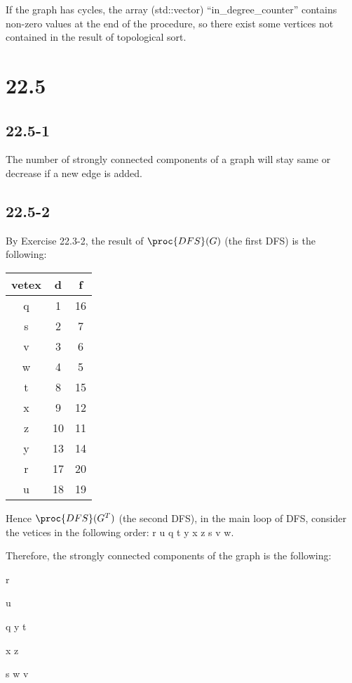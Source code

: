 If the graph has cycles, the array (std::vector) ``in\_degree\_counter'' 
contains non-zero values at the end of the procedure,
so there exist some vertices not contained in
the result of topological sort.

\section*{22.5}

\subsection*{22.5-1}

The number of strongly connected components of a graph will 
stay same or decrease if a new edge is added.

\subsection*{22.5-2}

By Exercise 22.3-2, the result of $\proc{DFS}(G)$ (the first DFS) is the following:

\begin{tabular}{c|c|c}
    vetex & d & f \\
    \hline
    q & 1 & 16 \\
    s & 2 & 7 \\
    v & 3 & 6 \\
    w & 4 & 5 \\
    t & 8 & 15 \\
    x & 9 & 12 \\
    z & 10 & 11 \\
    y & 13 & 14 \\
    r & 17 & 20 \\
    u & 18 & 19 \\
\end{tabular}

Hence $\proc{DFS}(G^T)$ (the second DFS), in the main loop of DFS, 
consider the vetices in the following order:
r u q t y x z s v w.

Therefore, the strongly connected components of the graph is the following:

\begin{description}
    \item r
    \item u
    \item q y t
    \item x z
    \item s w v
\end{description}

